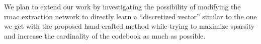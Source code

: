 We plan to extend our work by investigating the possibility of modifying the \gls{rmac} extraction network to directly learn a ``discretized vector'' similar to the one we get with the proposed hand-crafted method while trying to maximize sparsity and increase the cardinality of the codebook as much as possible.
